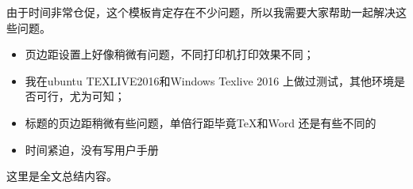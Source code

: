 

\begin{summary}
	
由于时间非常仓促，这个模板肯定存在不少问题，所以我需要大家帮助一起解决这
些问题。
\begin{itemize}
	\item 页边距设置上好像稍微有问题，不同打印机打印效果不同；
	\item 我在ubuntu TEXLIVE2016和Windows Texlive 2016 上做过测试，其他环境是否可行，尤为可知；
	\item 标题的页边距稍微有些问题，单倍行距毕竟\TeX{}和Word 还是有些不同的
	\item 时间紧迫，没有写用户手册
\end{itemize}

这里是全文总结内容。

\end{summary}